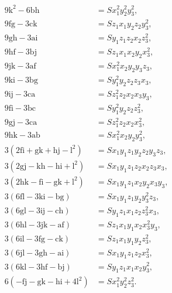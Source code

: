 \documentclass[11pt]{article}
\begin{document}
\[\begin{aligned}
9\mathrm{k}^2 - 6\mathrm{bh} &= S x_1^2 y_2^2 y_3^2,\\
9\mathrm{fg} - 3\mathrm{ck} &= S z_1 x_1 y_2 z_2 y_3^2,\\
9\mathrm{gh} - 3\mathrm{ai} &= S y_1 z_1 z_2 x_2 z_3^2,\\
9\mathrm{hf} - 3\mathrm{bj} &= S z_1 x_1 x_2 y_2 x_3^2,\\
9\mathrm{jk} - 3\mathrm{af} &= S x_1^2 x_2 y_2 y_3 z_3,\\
9\mathrm{ki} - 3\mathrm{bg} &= S y_1^2 y_2 z_2 z_3 x_3,\\
9\mathrm{ij} - 3\mathrm{ca} &= S z_1^2 z_2 x_2 x_3 y_3,\\
9\mathrm{fi} - 3\mathrm{bc} &= S y_1^2 y_2 z_2 z_3^2,\\
9\mathrm{gj} - 3\mathrm{ca} &= S z_1^2 z_2 x_2 x_3^2,\\
9\mathrm{hk} - 3\mathrm{ab} &= S x_1^2 x_2 y_2 y_3^2,\\
3(2\mathrm{fi} + \mathrm{gk} + \mathrm{hj} - \mathrm{l}^2) &= S x_1 y_1 z_1 y_2 z_2 y_3 z_3,\\
3(2\mathrm{gj} - \mathrm{kh} - \mathrm{hi} + \mathrm{l}^2) &= S x_1 y_1 z_1 z_2 x_2 z_3 x_3,\\
3(2\mathrm{hk} - \mathrm{fi} - \mathrm{gk} + \mathrm{l}^2) &= S x_1 y_1 z_1 x_2 y_2 x_3 y_3,\\
3(6\mathrm{fl} - 3\mathrm{ki} - \mathrm{bg}) &= S x_1 y_1 z_1 y_2 y_3^2 z_3,\\
3(6\mathrm{gl} - 3\mathrm{ij} - \mathrm{ch}) &= S y_1 z_1 x_1 z_2 z_3^2 x_3,\\
3(6\mathrm{hl} - 3\mathrm{jk} - \mathrm{af}) &= S z_1 x_1 y_1 x_2 x_3^2 y_3,\\
3(6\mathrm{il} - 3\mathrm{fg} - \mathrm{ck}) &= S z_1 x_1 y_1 y_2 z_3^2,\\
3(6\mathrm{jl} - 3\mathrm{gh} - \mathrm{ai}) &= S x_1 y_1 z_1 z_2 x_3^2,\\
3(6\mathrm{kl} - 3\mathrm{hf} - \mathrm{bj}) &= S y_1 z_1 x_1 x_2 y_3^2,\\
6(-\mathrm{fj} - \mathrm{gk} - \mathrm{hi} + 4\mathrm{l}^2) &= S x_1^2 y_2^2 z_3^2.
\end{aligned}
\]

\medskip
\end{document}

